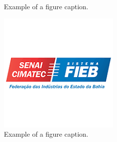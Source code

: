 \begin{figure}[H]
\begin{minipage}{.5\textwidth}
      \caption{Example of a figure caption.}
      \label{fig:prob1_6_2}
   \end{minipage}%
   \begin{minipage}{0.5\textwidth}
      \centering
      \includegraphics[width=0.5\linewidth, height=0.15\textheight]{images/fig-senai.png}
      \caption{Example of a figure caption.}
      \label{fig:prob1_6_1}
   \end{minipage} 
\end{figure}


